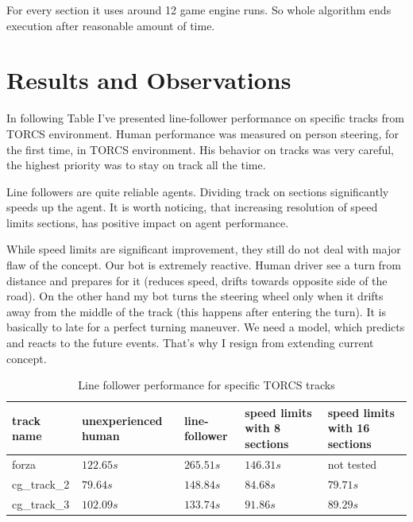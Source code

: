 \documentclass[declaration,shortabstract,english,inz]{iithesis}
\begin{document}
For every section it uses around 12 game engine runs.
So whole algorithm ends execution after reasonable amount of time.

\section{Results and Observations}

In following Table I've presented line-follower performance on specific tracks from TORCS environment. Human performance was measured on person steering, for the first time, in TORCS environment. His behavior on tracks was very careful, the highest priority was to stay on track all the time.

Line followers are quite reliable agents.
Dividing track on sections significantly speeds up the agent.
It is worth noticing, that increasing resolution of speed limits sections, has positive impact on agent performance.


While speed limits are significant improvement, they still do not deal with major flaw of the concept.
Our bot is extremely reactive.
Human driver see a turn from distance and prepares for it (reduces speed, drifts towards opposite side of the road).
On the other hand my bot turns the steering wheel only when it drifts away from the middle of the track (this happens after entering the turn).
It is basically to late for a perfect turning maneuver.
We need a model, which predicts and reacts to the  future events.
That's why I resign from extending current concept.


\begin{table}[h]
    \centering
    \begin{tabular}{ |p{1.7cm}|p{2.5cm}|p{2cm}|p{2.4cm}|p{2.4cm}|}
          \hline
          track name & unexperienced human & line-follower & speed limits with 8 sections & speed limits with 16 sections  \\
          \hline
          forza &  $122.65s$ & $265.51s$ & $146.31s$ & not tested  \\
          \hline
          cg\_track\_2 & $79.64s$ & $148.84s$ &  $84.68s$ & $79.71s$ \\ 

          \hline
          cg\_track\_3 & $102.09s$ & $133.74s$ & $91.86s$  & $89.29s$  \\
          \hline
    \end{tabular}
        \caption{Line follower performance for specific TORCS tracks}
        \label{tab:line_follower}

\end{table}
\end{document}

